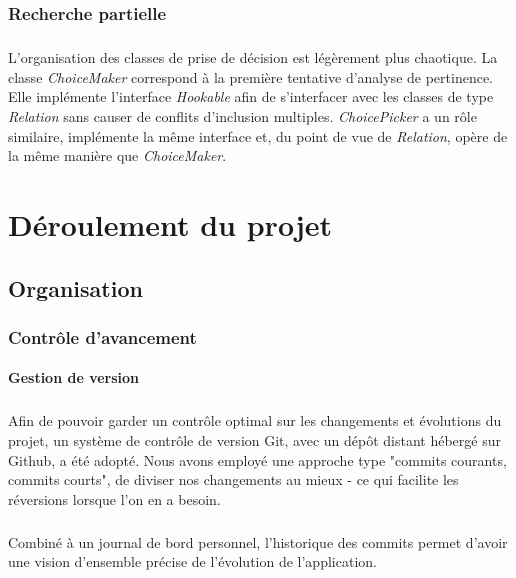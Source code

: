 \documentclass[a4paper,10pt]{report}
\begin{document}
\subsection{Recherche partielle}
\paragraph{}
  L'organisation des classes de prise de décision est légèrement plus chaotique.
La classe \textit{ChoiceMaker} correspond à la première tentative d'analyse de
pertinence. Elle implémente l'interface \textit{Hookable} afin de s'interfacer
avec les classes de type \textit{Relation} sans causer de conflits d'inclusion
multiples. \textit{ChoicePicker} a un rôle similaire, implémente la même
interface et, du point de vue de \textit{Relation}, opère de la même manière
que \textit{ChoiceMaker}.


\chapter{Déroulement du projet}
\section{Organisation}
\subsection{Contrôle d'avancement}

\subsubsection{Gestion de version}
\paragraph{}
  Afin de pouvoir garder un contrôle optimal sur les changements et évolutions
du projet, un système de contrôle de version Git, avec un dépôt distant hébergé
sur Github, a été adopté. Nous avons employé une approche type "commits
courants, commits courts", de diviser nos changements au mieux - ce qui facilite
les réversions lorsque l'on en a besoin.

\paragraph{}
  Combiné à un journal de bord personnel, l'historique des commits permet
d'avoir une vision d'ensemble précise de l'évolution de l'application.
\end{document}
